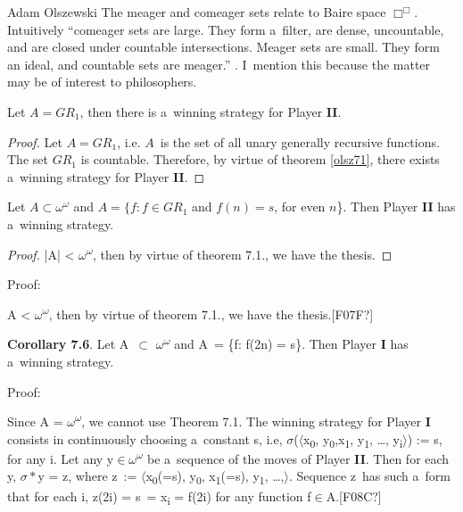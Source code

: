 \begin{artengenv}{Adam Olszewski}
The meager and comeager sets relate to Baire space $\Box^\Box$. Intuitively ``comeager sets are large. They form a~filter, are dense, uncountable, and are closed under countable intersections. Meager sets are small. They form an ideal, and countable sets are meager.''
\parencite[][p.212]{soare_turing_2016}. %
 I~mention this because the matter may be of interest to philosophers.
\begin{proposition}
Let $A=GR_{1}$, then there is a~winning strategy for Player \textbf{II}.
\end{proposition}
\begin{proof}
Let $A=GR_{1}$, i.e. $A$~is the set of all unary generally recursive functions. The set $GR_{1}$ is countable. Therefore, by virtue of theorem \ref{olsz71}, there exists a~winning strategy for Player \textbf{II}.
\end{proof}
%

\begin{proposition}
Let $A \subset \omega^{\omega}$ and $A = \{f: f \in GR_{1}$ and $f(n)=s$, for even $n$\}. Then Player \textbf{II} has a~winning strategy.
\end{proposition}
\begin{proof}
|A| {\textless} {\textbar}${\omega}$\textsuperscript{${\omega}$}{\textbar}, then by virtue of theorem 7.1., we have the thesis.
\end{proof}
Proof:

{\textbar}A{\textbar} {\textless} {\textbar}${\omega}$\textsuperscript{${\omega}$}{\textbar}, then by virtue of theorem 7.1., we have the thesis.[F07F?]

\textbf{Corollary 7.6}. Let A~${\subset}$ ${\omega}$\textsuperscript{${\omega}$} and A~= \{f: f(2n) = s\}. Then Player \textbf{I} has a~winning strategy.

Proof:

Since {\textbar}A{\textbar} = {\textbar}${\omega}$\textsuperscript{${\omega}$}{\textbar}, we cannot use Theorem 7.1. The winning strategy for Player \textbf{I} consists in continuously choosing a~constant s, i.e, ${\sigma}$(${\langle}$x\textsubscript{0}, y\textsubscript{0},x\textsubscript{1}, y\textsubscript{1}, \ldots, y\textsubscript{i}${\rangle}$) := s, for any i. Let any y${\in}{\omega}$\textsuperscript{${\omega}$} be a~sequence of the moves of Player \textbf{II}. Then for each y, ${\sigma}*$y = z, where z~:= ${\langle}$x\textsubscript{0}(=s), y\textsubscript{0}, x\textsubscript{1}(=s), y\textsubscript{1}, \ldots,${\rangle}$. Sequence z~has such a~form that for each i, z(2i) = s~= x\textsubscript{i} = f(2i) for any function f${\in}$A.[F08C?]


\end{artengenv}

